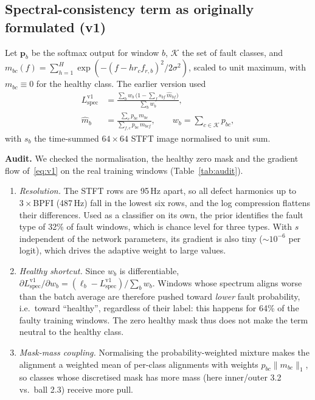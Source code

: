 \documentclass[conference]{IEEEtran}
\newcommand{\Lspec}{L_{\mathrm{spec}}}
\begin{document}
\subsection{Spectral-consistency term as originally formulated (v1)}
Let $\mathbf{p}_b$ be the softmax output for window $b$, $\mathcal{K}$ the
set of fault classes, and $m_{bc}(f)=\sum_{h=1}^{H}\exp(-(f-h r_c f_{r,b})^2/2\sigma^2)$,
scaled to unit maximum, with $m_{bc}\equiv0$ for the healthy class. The earlier
version used
\begin{equation}
\begin{aligned}
\Lspec^{\mathrm{v1}} &= \frac{\sum_b w_b\,\bigl(1-\sum_f s_{bf}\,\hat m_{bf}\bigr)}{\sum_b w_b},\\
\hat m_b &= \frac{\sum_c p_{bc}\, m_{bc}}{\sum_{f,c} p_{bc}\, m_{bcf}},\qquad
w_b=\sum_{c\in\mathcal K}p_{bc},
\end{aligned}
\label{eq:v1}
\end{equation}
with $s_b$ the time-summed $64\times64$ STFT image normalised to unit sum.

\textbf{Audit.} We checked the normalisation, the healthy zero mask and the
gradient flow of~\eqref{eq:v1} on the real training windows
(Table~\ref{tab:audit}).
\begin{enumerate}
\item \emph{Resolution.} The STFT rows are 95\,Hz apart, so all defect
harmonics up to $3\times$BPFI (487\,Hz) fall in the lowest six rows, and the
log compression flattens their differences. Used as a classifier on its own,
the prior identifies the fault type of 32\% of fault windows, which is chance level
for three types. With $s$ independent of the network parameters, its gradient is
also tiny ($\sim10^{-6}$ per logit), which drives the adaptive weight to
large values.
\item \emph{Healthy shortcut.} Since $w_b$ is differentiable,
$\partial\Lspec^{\mathrm{v1}}/\partial w_b=(\ell_b-\Lspec^{\mathrm{v1}})/\sum_b w_b$.
Windows whose spectrum aligns worse than the batch average are therefore
pushed toward \emph{lower} fault probability, i.e.\ toward ``healthy'',
regardless of their label: this happens for 64\% of the faulty training
windows. The zero healthy mask thus does not make the term neutral to the
healthy class.
\item \emph{Mask-mass coupling.} Normalising the probability-weighted mixture
makes the alignment a weighted mean of per-class alignments with weights
$p_{bc}\lVert m_{bc}\rVert_1$, so classes whose discretised mask has more mass
(here inner/outer 3.2 vs.\ ball 2.3) receive more pull.
\end{enumerate}
\end{document}
